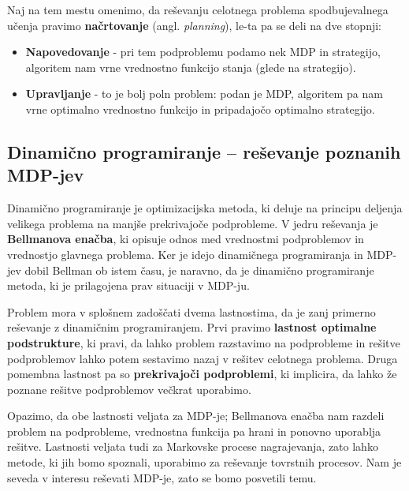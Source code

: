 \documentclass[12pt,a4paper]{amsart}
\theoremstyle{definition} %
\theoremstyle{plain} %
\begin{document}
Naj na tem mestu omenimo, da reševanju celotnega problema spodbujevalnega učenja 
pravimo \textbf{načrtovanje} (angl. \textit{planning}), le-ta pa se deli na dve stopnji: 

\begin{itemize}
    \item \textbf{Napovedovanje} - pri tem podproblemu podamo nek MDP in strategijo, algoritem nam 
            vrne vrednostno funkcijo stanja (glede na strategijo).   
    \item \textbf{Upravljanje} - to je bolj poln problem: podan je MDP, algoritem pa nam vrne 
            optimalno vrednostno funkcijo in pripadajočo optimalno strategijo.
\end{itemize}

\subsection{Dinamično programiranje -- reševanje poznanih MDP-jev}
Dinamično programiranje je optimizacijska metoda, ki deluje na principu deljenja velikega problema 
na manjše prekrivajoče podprobleme. V jedru reševanja je \textbf{Bellmanova enačba}, ki opisuje 
odnos med vrednostmi podproblemov in vrednostjo glavnega problema. Ker je idejo dinamičnega 
programiranja in MDP-jev dobil Bellman ob istem času, je naravno, da je dinamično programiranje 
metoda, ki je prilagojena prav situaciji v MDP-ju.

Problem mora v splošnem zadoščati dvema lastnostima, da je zanj primerno reševanje z dinamičnim 
programiranjem. Prvi pravimo \textbf{lastnost optimalne podstrukture}, ki pravi, da lahko problem 
razstavimo na podprobleme in rešitve podproblemov lahko potem sestavimo nazaj v rešitev celotnega 
problema. Druga pomembna lastnost pa so \textbf{prekrivajoči podproblemi}, ki implicira, da lahko 
že poznane rešitve podproblemov večkrat uporabimo.

Opazimo, da obe lastnosti veljata za MDP-je; Bellmanova enačba nam razdeli problem na 
podprobleme, vrednostna funkcija pa hrani in ponovno uporablja rešitve. Lastnosti veljata tudi 
za Markovske procese nagrajevanja, zato lahko metode, ki jih bomo spoznali, uporabimo za reševanje
tovrstnih procesov. Nam je seveda v interesu reševati MDP-je, zato se bomo posvetili temu.
\end{document}
